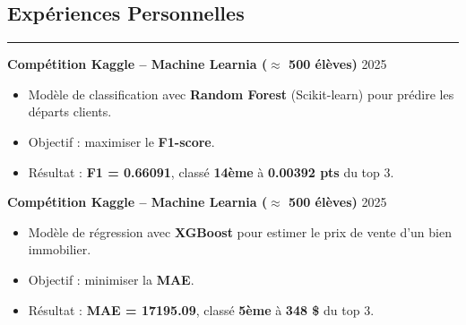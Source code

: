 \documentclass[a4paper,12pt]{article}
\newcommand{\sectionrule}[1]{%
  \section*{#1}%
  \vspace{-1em}%
  {\color{bleufonce}\noindent\rule{\linewidth}{1pt}}%
  \vspace{0.5em}%
}
\begin{document}
\begin{paracol}{2}
\begin{rightcolumn}
\begin{minipage}[t][\dimexpr\textheight - 9em\relax][t]{\dimexpr\linewidth - 1.5em\relax}
{\vspace{0.5em}
\sectionrule{Expériences Personnelles}

\textbf{Compétition Kaggle – Machine Learnia ($\approx$ 500 élèves)} \hfill {\color{blue}2025}  
\begin{itemize}[leftmargin=1em, nosep]
  \vspace{0.2em}
  \item Modèle de classification avec \textbf{Random Forest} (Scikit-learn) pour prédire les départs clients.
  \item Objectif : maximiser le \textbf{F1-score}. 
  \item Résultat : \textbf{F1 = 0.66091}, classé \textbf{14ème} à \textbf{0.00392 pts} du top 3.
\end{itemize}

\vspace{0.7em}

\textbf{Compétition Kaggle – Machine Learnia ($\approx$ 500 élèves)} \hfill {\color{blue}2025}  
\begin{itemize}[leftmargin=1em, nosep]
  \vspace{0.2em}
  \item Modèle de régression avec \textbf{XGBoost} pour estimer le prix de vente d’un bien immobilier.
  \item Objectif : minimiser la \textbf{MAE}. 
  \item Résultat : \textbf{MAE = 17195.09}, classé \textbf{5ème} à \textbf{348 \$} du top 3.
\end{itemize}

} %
\end{minipage}
\end{rightcolumn}

\end{paracol}
\end{document}
